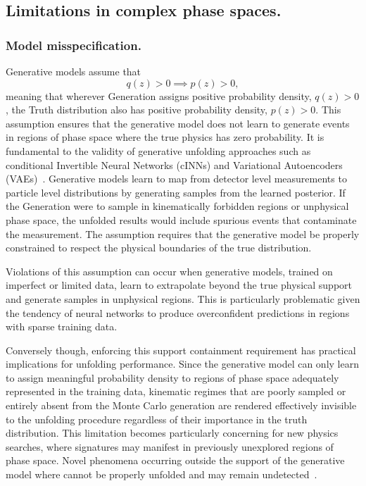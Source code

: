     \subsection{Limitations in complex phase spaces.}  

        \subsubsection{Model misspecification.}  
            Generative models assume that \[q(z) > 0 \implies p(z) > 0,\] meaning that wherever Generation assigns positive probability density, \(q(z) > 0\), the Truth distribution also has positive probability density, \(p(z) > 0\).
            This assumption ensures that the generative model does not learn to generate events in regions of phase space where the true physics has zero probability.
            It is fundamental to the validity of generative unfolding approaches such as conditional Invertible Neural Networks (cINNs) and Variational Autoencoders (VAEs)~\cite{Shmakov2025FullDiffusion}.
            Generative models learn to map from detector level measurements to particle level distributions by generating samples from the learned posterior.
            If the Generation were to sample in kinematically forbidden regions or unphysical phase space, the unfolded results would include spurious events that contaminate the measurement.
            The assumption requires that the generative model be properly constrained to respect the physical boundaries of the true distribution.
            
            Violations of this assumption can occur when generative models, trained on imperfect or limited data, learn to extrapolate beyond the true physical support and generate samples in unphysical regions.
            This is particularly problematic given the tendency of neural networks to produce overconfident predictions in regions with sparse training data.
            
            Conversely though, enforcing this support containment requirement has practical implications for unfolding performance.
            Since the generative model can only learn to assign meaningful probability density to regions of phase space adequately represented in the training data, kinematic regimes that are poorly sampled or entirely absent from the Monte Carlo generation are rendered effectively invisible to the unfolding procedure regardless of their importance in the truth distribution.
            This limitation becomes particularly concerning for new physics searches, where signatures may manifest in previously unexplored regions of phase space.
            Novel phenomena occurring outside the support of the generative model where cannot be properly unfolded and may remain undetected~\cite{Amsler2008MonteTechniques}. 
            
